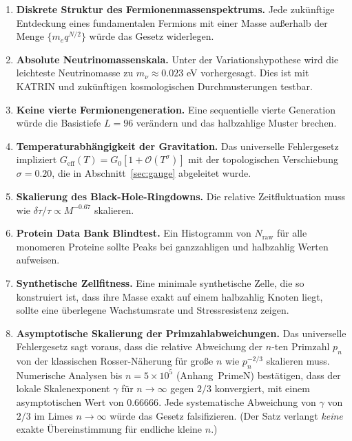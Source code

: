 \documentclass[12pt,a4paper]{article}
\theoremstyle{remark}
\begin{document}
	\begin{enumerate}[label=(\arabic*)]
		\item \textbf{Diskrete Struktur des Fermionenmassenspektrums.} Jede zukünftige
		Entdeckung eines fundamentalen Fermions mit einer Masse außerhalb der Menge
		\(\{m_e q^{N/2}\}\) würde das Gesetz widerlegen.
		\item \textbf{Absolute Neutrinomassenskala.} Unter der Variationshypothese
		\cite{AppendixLambda} wird die leichteste Neutrinomasse zu
		\(m_{\nu} \approx 0.023\) eV vorhergesagt. Dies ist mit KATRIN und zukünftigen
		kosmologischen Durchmusterungen testbar.
		\item \textbf{Keine vierte Fermionengeneration.} Eine sequentielle vierte
		Generation würde die Basistiefe \(L = 96\) verändern und das halbzahlige
		Muster brechen.
		\item \textbf{Temperaturabhängigkeit der Gravitation.} Das universelle
		Fehlergesetz impliziert \(G_{\mathrm{eff}}(T) = G_0[1 + \mathcal{O}(T^{\sigma})]\)
		mit der topologischen Verschiebung \(\sigma = 0.20\), die in
		Abschnitt~\ref{sec:gauge} abgeleitet wurde.
		\item \textbf{Skalierung des Black-Hole-Ringdowns.} Die relative
		Zeitfluktuation muss wie \(\delta\tau/\tau \propto M^{-0.67}\) skalieren.
		\item \textbf{Protein Data Bank Blindtest.} Ein Histogramm von \(N_{\mathrm{raw}}\)
		für alle monomeren Proteine sollte Peaks bei ganzzahligen und halbzahlig
		Werten aufweisen.
		\item \textbf{Synthetische Zellfitness.} Eine minimale synthetische Zelle,
		die so konstruiert ist, dass ihre Masse exakt auf einem halbzahlig Knoten
		liegt, sollte eine überlegene Wachstumsrate und Stressresistenz zeigen.
		\item \textbf{Asymptotische Skalierung der Primzahlabweichungen.} Das
		universelle Fehlergesetz sagt voraus, dass die relative Abweichung der
		\(n\)-ten Primzahl \(p_n\) von der klassischen Rosser-Näherung für große
		\(n\) wie \(p_n^{-2/3}\) skalieren muss. Numerische Analysen bis
		\(n = 5\times10^5\) (Anhang~PrimeN) bestätigen, dass der lokale
		Skalenexponent \(\gamma\) für \(n\to\infty\) gegen \(2/3\) konvergiert,
		mit einem asymptotischen Wert von \(0.66666\). Jede systematische
		Abweichung von \(\gamma\) von \(2/3\) im Limes \(n\to\infty\) würde das
		Gesetz falsifizieren. (Der Satz verlangt \emph{keine} exakte
		Übereinstimmung für endliche kleine \(n\).)
	\end{enumerate}
	
\end{document}
